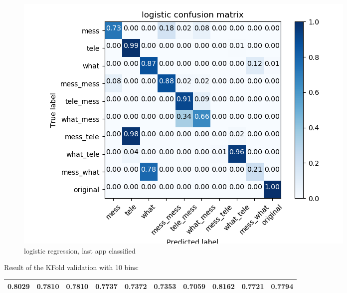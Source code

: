  \begin{figure}[H] 
\centering 
\includegraphics[scale=.6]{images/new_met_lr_initial_single_double_complete.png} 
\caption{logistic regression, last app classified} 
\end{figure} 


Result of the KFold validation with 10 bins:
 {\def\arraystretch{1.3} 
 \begin{table}[H] 
\centering 
\begin{tabular}{|l |l |l |l |l |l |l |l |l |l |}  
\hline 
0.8029&
0.7810&
0.7810&
0.7737&
0.7372&
0.7353&
0.7059&
0.8162&
0.7721&
0.7794\\ \hline  

\end{tabular} 
\end{table} }

